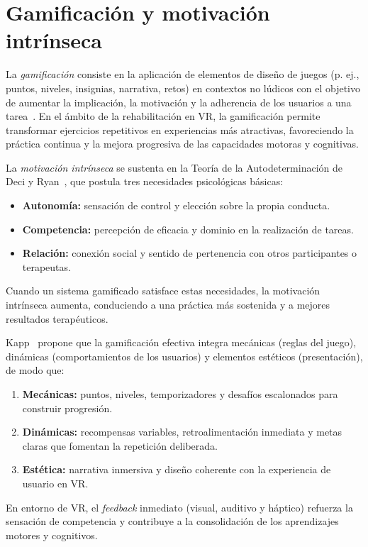 \section{Gamificación y motivación intrínseca}

La \emph{gamificación} consiste en la aplicación de elementos de diseño de juegos (p. ej., puntos, niveles, insignias, narrativa, retos) en contextos no lúdicos con el objetivo de aumentar la implicación, la motivación y la adherencia de los usuarios a una tarea~\cite{deterding2011defining}. En el ámbito de la rehabilitación en VR, la gamificación permite transformar ejercicios repetitivos en experiencias más atractivas, favoreciendo la práctica continua y la mejora progresiva de las capacidades motoras y cognitivas.

La \emph{motivación intrínseca} se sustenta en la Teoría de la Autodeterminación de Deci y Ryan~\cite{deci1985intrinsic}, que postula tres necesidades psicológicas básicas:
\begin{itemize}
  \item \textbf{Autonomía:} sensación de control y elección sobre la propia conducta.
  \item \textbf{Competencia:} percepción de eficacia y dominio en la realización de tareas.
  \item \textbf{Relación:} conexión social y sentido de pertenencia con otros participantes o terapeutas.
\end{itemize}
Cuando un sistema gamificado satisface estas necesidades, la motivación intrínseca aumenta, conduciendo a una práctica más sostenida y a mejores resultados terapéuticos.

Kapp~\cite{kapp2012gamification} propone que la gamificación efectiva integra mecánicas (reglas del juego), dinámicas (comportamientos de los usuarios) y elementos estéticos (presentación), de modo que:
\begin{enumerate}
  \item \textbf{Mecánicas:} puntos, niveles, temporizadores y desafíos escalonados para construir progresión.
  \item \textbf{Dinámicas:} recompensas variables, retroalimentación inmediata y metas claras que fomentan la repetición deliberada.
  \item \textbf{Estética:} narrativa inmersiva y diseño coherente con la experiencia de usuario en VR.
\end{enumerate}
En entorno de VR, el \emph{feedback} inmediato (visual, auditivo y háptico) refuerza la sensación de competencia y contribuye a la consolidación de los aprendizajes motores y cognitivos.

